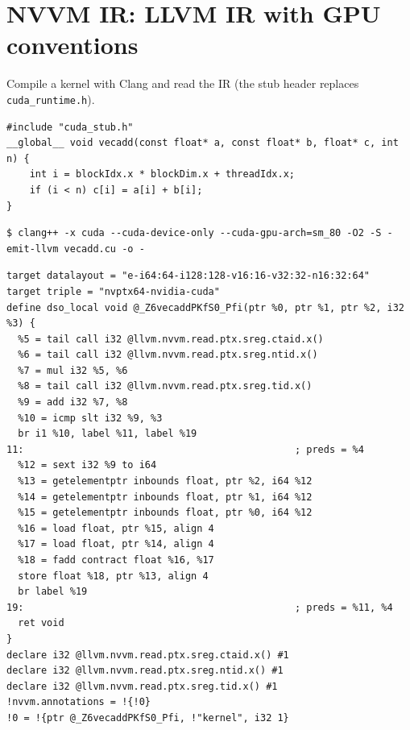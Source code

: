 \documentclass[10pt,a4paper,openany,oneside]{report}
\newcommand{\prio}[1]{\texorpdfstring{\ifcase#1\or{\color{gold}\ding{72}}\or{\color{gold}\ding{72}\ding{72}}\or{\color{gold}\ding{72}\ding{72}\ding{72}}\fi}{}}
\begin{document}
\section{NVVM IR: LLVM IR with GPU conventions \prio{2}}
Compile a kernel with Clang and read the IR (the stub header replaces \texttt{cuda\_runtime.h}).
\begin{lstlisting}[language={CUDA},title={vecadd.cu}]
#include "cuda_stub.h"
__global__ void vecadd(const float* a, const float* b, float* c, int n) {
    int i = blockIdx.x * blockDim.x + threadIdx.x;
    if (i < n) c[i] = a[i] + b[i];
}
\end{lstlisting}
\begin{lstlisting}[style=shcmd]
$ clang++ -x cuda --cuda-device-only --cuda-gpu-arch=sm_80 -O2 -S -emit-llvm vecadd.cu -o -
\end{lstlisting}
\begin{lstlisting}[language={LLVMIR},style=out]
target datalayout = "e-i64:64-i128:128-v16:16-v32:32-n16:32:64"
target triple = "nvptx64-nvidia-cuda"
define dso_local void @_Z6vecaddPKfS0_Pfi(ptr %0, ptr %1, ptr %2, i32 %3) {
  %5 = tail call i32 @llvm.nvvm.read.ptx.sreg.ctaid.x()
  %6 = tail call i32 @llvm.nvvm.read.ptx.sreg.ntid.x()
  %7 = mul i32 %5, %6
  %8 = tail call i32 @llvm.nvvm.read.ptx.sreg.tid.x()
  %9 = add i32 %7, %8
  %10 = icmp slt i32 %9, %3
  br i1 %10, label %11, label %19
11:                                               ; preds = %4
  %12 = sext i32 %9 to i64
  %13 = getelementptr inbounds float, ptr %2, i64 %12
  %14 = getelementptr inbounds float, ptr %1, i64 %12
  %15 = getelementptr inbounds float, ptr %0, i64 %12
  %16 = load float, ptr %15, align 4
  %17 = load float, ptr %14, align 4
  %18 = fadd contract float %16, %17
  store float %18, ptr %13, align 4
  br label %19
19:                                               ; preds = %11, %4
  ret void
}
declare i32 @llvm.nvvm.read.ptx.sreg.ctaid.x() #1
declare i32 @llvm.nvvm.read.ptx.sreg.ntid.x() #1
declare i32 @llvm.nvvm.read.ptx.sreg.tid.x() #1
!nvvm.annotations = !{!0}
!0 = !{ptr @_Z6vecaddPKfS0_Pfi, !"kernel", i32 1}
\end{lstlisting}
\end{document}
